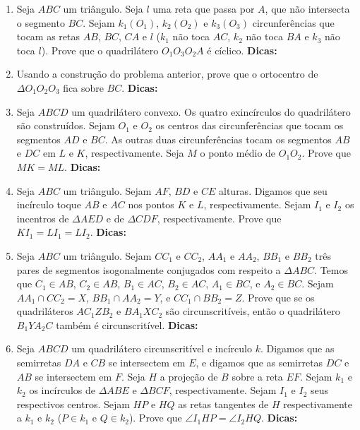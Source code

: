 \documentclass{article}
\newcommand{\dica}{\textbf{Dicas:}}
\newcommand{\iniTri}{Seja $ABC$ um triângulo}
\begin{document}
\begin{multicols}{2}
\begin{enumerate}
    \item \iniTri. Seja $l$ uma reta que passa por $A$, que não intersecta o segmento $BC$. Sejam $k_1(O_1)$, $k_2(O_2)$ e $k_3(O_3)$ circunferências que tocam as retas $AB$, $BC$, $CA$ e $l$ ($k_1$ não toca $AC$, $k_2$ não toca $BA$ e $k_3$ não toca $l$). Prove que o quadrilátero $O_1O_3O_2A$ é cíclico. \dica %
    
    \item Usando a construção do problema anterior, prove que o ortocentro de $\Delta O_1O_2O_3$ fica sobre $BC$. \dica %
    
    \item Seja $ABCD$ um quadrilátero convexo. Os quatro exincírculos do quadrilátero são construídos. Sejam $O_1$ e $O_2$ os centros das circunferências que tocam os segmentos $AD$ e $BC$. As outras duas circunferências tocam os segmentos $AB$ e $DC$ em $L$ e $K$, respectivamente. Seja $M$ o ponto médio de $O_1O_2$. Prove que $MK=ML$. \dica %
    
    \item \iniTri. Sejam $AF$, $BD$ e $CE$ alturas. Digamos que seu incírculo toque $AB$ e $AC$ nos pontos $K$ e $L$, respectivamente. Sejam $I_1$ e $I_2$ os incentros de $\Delta AED$ e de $\Delta CDF$, respectivamente. Prove que $KI_1=LI_1=LI_2$. \dica %
    
    \item \iniTri. Sejam $CC_1$ e $CC_2$, $AA_1$ e $AA_2$, $BB_1$ e $BB_2$ três pares de segmentos isogonalmente conjugados com respeito a $\Delta ABC$. Temos que $C_1\in AB$, $C_2\in AB$, $B_1\in AC$, $B_2\in AC$, $A_1\in BC$, e $A_2\in BC$. Sejam $AA_1\cap CC_2=X$, $BB_1\cap AA_2=Y$, e $CC_1\cap BB_2=Z$. Prove que se os quadriláteros $AC_1ZB_2$ e $BA_1XC_2$ são circunscritíveis, então o quadrilátero $B_1YA_2C$ também é circunscritível. \dica %
    
    \item Seja $ABCD$ um quadrilátero circunscritível e incírculo $k$. Digamos que as semirretas $DA$ e $CB$ se intersectem em $E$, e digamos que as semirretas $DC$ e $AB$ se intersectem em $F$. Seja $H$ a projeção de $B$ sobre a reta $EF$. Sejam $k_1$ e $k_2$ os incírculos de $\Delta ABE$ e $\Delta BCF$, respectivamente. Sejam $I_1$ e $I_2$ seus respectivos centros. Sejam $HP$ e $HQ$ as retas tangentes de $H$ respectivamente a $k_1$ e $k_2$ ($P\in k_1$ e $Q\in k_2$). Prove que $\angle I_1HP=\angle I_2HQ$. \dica %
    

\end{enumerate}
\end{multicols}
\end{document}
